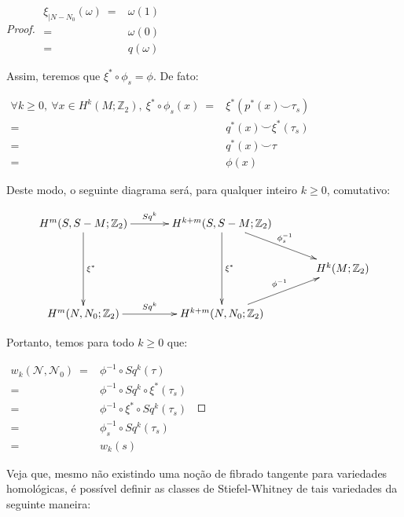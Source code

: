 \documentclass[12pt,oneside]{book} %
\newcommand{\Z}{\mathbb{Z}}
\newcommand{\ccup}{\smile}
\begin{document}
\begin{proof}
	$\begin{array}{rl}
		\xi_{|N-N_{0}}(\omega) \ = & \omega(1) \\
								 = & \omega(0) \\
								 = & q(\omega)
	\end{array}$\newline

\par Assim, teremos que $\xi^{*}\circ\phi_{s}=\phi$. De fato:\newline

	$\begin{array}{rl}
		\forall k\geq 0, \ \forall x\in H^{k}(M;\Z_{2}), \ \xi^{*}\circ\phi_{s}(x) \ = & \xi^{*}\left( p^{*}(x)\ccup\tau_{s} \right) \\
		 = & q^{*}(x)\ccup\xi^{*}(\tau_{s}) \\
		 = & q^{*}(x)\ccup \tau \\
		 = & \phi(x)
	\end{array}$ \newline

\par Deste modo, o seguinte diagrama será, para qualquer inteiro $k\geq 0$, comutativo:

$$ \xymatrix @C=0.5cm {
	H^{m}(S,S-M;\Z_{2}) \ar[dd]^-{\xi^{*}} \ar[rr]^-{Sq^{k}} && H^{k+m}(S,S-M;\Z_{2}) \ar[dd]^-{\xi^{*}} \ar[rrd]^-{\phi_{s}^{-1}} && \\
	&& && H^{k}(M;\Z_{2}) \\
	H^{m}(N,N_{0};\Z_{2}) \ar[rr]^-{Sq^{k}} && H^{k+m}(N,N_{0};\Z_{2}) \ar[rru]^-{\phi^{-1}} &&
} $$

\par Portanto, temos para todo $k\geq 0$ que: \newline

$ \begin{array}{rl}
	w_{k}(\mathcal{N},\mathcal{N}_{0}) \ = & \phi^{-1}\circ Sq^{k}(\tau) \\
	= & \phi^{-1}\circ Sq^{k}\circ \xi^{*}(\tau_{s}) \\
	= & \phi^{-1}\circ \xi^{*}\circ Sq^{k}(\tau_{s}) \\
	= & \phi_{s}^{-1}\circ Sq^{k}(\tau_{s}) \\
	= & w_{k}(s)
\end{array} $

\end{proof}

\par Veja que, mesmo não existindo uma noção de fibrado tangente para variedades homológicas, é possível definir as classes de Stiefel-Whitney de tais variedades da seguinte maneira:
\end{document}
